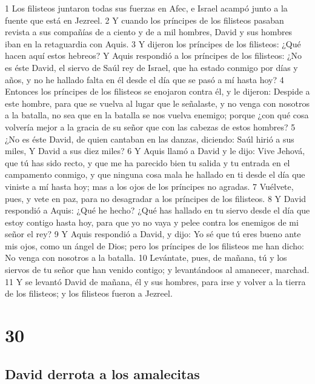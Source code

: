1 Los filisteos juntaron todas sus fuerzas en Afec, e Israel acampó junto a la fuente que está en Jezreel.
2 Y cuando los príncipes de los filisteos pasaban revista a sus compañías de a ciento y de a mil hombres, David y sus hombres iban en la retaguardia con Aquis.
3 Y dijeron los príncipes de los filisteos: ¿Qué hacen aquí estos hebreos? Y Aquis respondió a los príncipes de los filisteos: ¿No es éste David, el siervo de Saúl rey de Israel, que ha estado conmigo por días y años, y no he hallado falta en él desde el día que se pasó a mí hasta hoy?
4 Entonces los príncipes de los filisteos se enojaron contra él, y le dijeron: Despide a este hombre, para que se vuelva al lugar que le señalaste, y no venga con nosotros a la batalla, no sea que en la batalla se nos vuelva enemigo; porque ¿con qué cosa volvería mejor a la gracia de su señor que con las cabezas de estos hombres?
5 ¿No es éste David, de quien cantaban en las danzas, diciendo:
Saúl hirió a sus miles,
Y David a sus diez miles?
6 Y Aquis llamó a David y le dijo: Vive Jehová, que tú has sido recto, y que me ha parecido bien tu salida y tu entrada en el campamento conmigo, y que ninguna cosa mala he hallado en ti desde el día que viniste a mí hasta hoy; mas a los ojos de los príncipes no agradas.
7 Vuélvete, pues, y vete en paz, para no desagradar a los príncipes de los filisteos.
8 Y David respondió a Aquis: ¿Qué he hecho? ¿Qué has hallado en tu siervo desde el día que estoy contigo hasta hoy, para que yo no vaya y pelee contra los enemigos de mi señor el rey?
9 Y Aquis respondió a David, y dijo: Yo sé que tú eres bueno ante mis ojos, como un ángel de Dios; pero los príncipes de los filisteos me han dicho: No venga con nosotros a la batalla.
10 Levántate, pues, de mañana, tú y los siervos de tu señor que han venido contigo; y levantándoos al amanecer, marchad.
11 Y se levantó David de mañana, él y sus hombres, para irse y volver a la tierra de los filisteos; y los filisteos fueron a Jezreel.

\chapter{30}

\section*{David derrota a los amalecitas}


